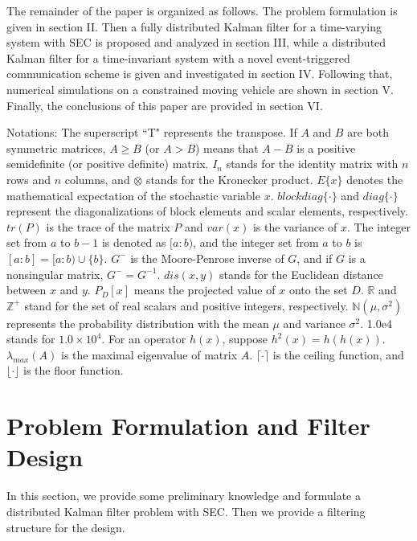 \documentclass[journal,transmag]{IEEEtran}
\begin{document}
\begin{enumerate}
		
	
	\end{enumerate}

	
	The remainder of the paper is organized as follows. The problem formulation is given in section II.
	Then a fully distributed Kalman filter for a time-varying system with SEC is proposed and analyzed in section III, while
	a distributed Kalman filter for a time-invariant system with a novel event-triggered communication  scheme is given and investigated in section IV.   Following that,
	numerical simulations on a constrained moving vehicle are shown in section V. Finally, the conclusions of this paper are provided in section VI.
	
	Notations: The superscript ``T" represents the transpose.  If $A$ and $B$ are both symmetric matrices, $A\geq B$ (or $A>B$) means that $A-B$ is a positive semidefinite (or positive definite) matrix. $I_{n}$ stands for the identity matrix with $n$ rows and $n$ columns, and $\otimes$ stands for the  Kronecker product. $E\{x\}$ denotes the mathematical expectation of the stochastic variable $x$. $blockdiag\{\cdot\}$ and $diag\{\cdot\}$ represent the diagonalizations of block elements and scalar elements, respectively. $tr(P)$ is the trace of the matrix $P$ and $var(x)$ is the variance of $x$.
	The integer set from $a$ to $b-1$ is denoted as $[a:b)$, and the integer set from $a$ to $b$ is $[a:b]=[a:b)\cup\{b\}$. $G^-$ is the Moore-Penrose inverse of $G$, and if $G$ is a nonsingular matrix, $G^-=G^{-1}$.
	{$dis(x,y)$ stands for the Euclidean distance between $x$ and $y$. $P_{D}[x]$ means the projected value of $x$ onto the set $D$.
$\mathbb{R}$ and $\mathbb{Z}^+$ stand for the set of real scalars and positive integers, respectively. $\mathbb{N}(\mu,\sigma^2)$ represents the probability distribution with the mean $\mu$ and variance $\sigma^2$. 1.0e4 stands for $1.0\times 10^4$. 	}
	For an operator $h(x)$, suppose $h^2(x)=h(h(x))$. $\lambda_{max}(A)$ is the maximal eigenvalue of matrix $A$. $\lceil \cdot\rceil$ is the ceiling function, and $\lfloor\cdot\rfloor$ is the floor function.
	
	\section{Problem Formulation and  Filter Design}
	
	In this section, we provide some preliminary knowledge and formulate a distributed Kalman filter problem with SEC.   Then we provide a filtering structure for the design.
	
\end{document}
